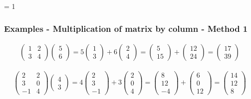 \documentclass[usenames,dvipsnames,aspectratio=169,10pt]{beamer}
\def \EXAMPLEVERSION {3} %
\numberwithin{equation}{section}
\begin{document}
\ifnum \EXAMPLEVERSION = 1
\begin{frame}
\frametitle{Examples - Multiplication of matrix by column - Method 1}

\begin{align*}
\begin{pmatrix}
 1 & 2 \\
 3 & 4 
\end{pmatrix}
\begin{pmatrix}
 5 \\
 6 
\end{pmatrix}
=
5
\begin{pmatrix}
 1 \\
 3 
\end{pmatrix}
+
6
\begin{pmatrix}
 2 \\
 4 
\end{pmatrix}
=
\begin{pmatrix}
 5 \\
 15 
\end{pmatrix}
+
\begin{pmatrix}
 12 \\
 24 
\end{pmatrix}
=
\begin{pmatrix}
 17 \\
 39 
\end{pmatrix}
\end{align*}



\begin{align*}
\begin{pmatrix}
 2  & 2 \\
 3  & 0  \\
 -1 & 4 
\end{pmatrix}
\begin{pmatrix}
 4 \\
 3 
\end{pmatrix}
=
4
\begin{pmatrix}
  2 \\
  3 \\
 -1 
\end{pmatrix}
+
3
\begin{pmatrix}
 2 \\
 0  \\
 4 
\end{pmatrix}
=
\begin{pmatrix}
  8 \\
 12 \\
 -4
\end{pmatrix}
+
\begin{pmatrix}
 6 \\
 0  \\
 12 
\end{pmatrix}
=
\begin{pmatrix}
 14 \\
 12  \\
  8 
\end{pmatrix}
\end{align*}

\end{frame}
\fi 
\end{document}
